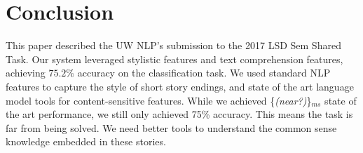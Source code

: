 \documentclass[11pt]{article}
\newcommand{\ms}[1]{{\color{cyan}\{\textit{#1}\}$_{ms}$}}
\begin{document}

\section{Conclusion}
This paper described the UW NLP's submission to the 2017 LSD Sem Shared Task. 
Our system leveraged stylistic features and text comprehension features, achieving $75.2\%$ accuracy on the classification task. We used standard NLP features to capture the style of short story endings, and state of the art language model tools for content-sensitive features.
While we achieved \ms{(near?)} state of the art performance, we still only achieved 75\% accuracy. This means the task is far from being solved. We need better tools to understand the common sense knowledge embedded in these stories.



\end{document}
